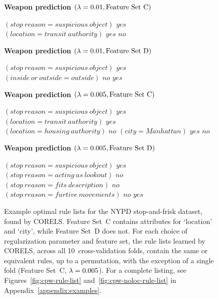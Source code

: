 \begin{figure}[t!]
\textbf{Weapon prediction $({\lambda} = 0.01, \text{Feature Set~C})$}
\vspace{1mm}
\begin{algorithmic}
\State \bif $(stop~reason = suspicious~object)$ \bthen $yes$ %
\State \belif $(location = transit~authority)$ \bthen $yes$
\State \belse $no$
\end{algorithmic}
\vspace{1mm}
\textbf{Weapon prediction $({\lambda} = 0.01, \text{Feature Set~D})$}
\vspace{1mm}
\begin{algorithmic}
\State \bif $(stop~reason = suspicious~object)$ \bthen $yes$ %
\State \belif $(inside~or~outside = outside)$ \bthen $no$
\State \belse $yes$
\end{algorithmic}
\vspace{1mm}
\textbf{Weapon prediction $({\lambda} = 0.005, \text{Feature Set~C})$}
\begin{algorithmic}
\State \bif $(stop~reason = suspicious~object)$ \bthen $yes$ %
\State \belif $(location = transit~authority)$ \bthen $yes$
\State \belif $(location = housing~authority)$ \bthen $no$
\State \belif $(city = Manhattan)$ \bthen $yes$
\State \belse $no$
\end{algorithmic}
\vspace{1mm}
\textbf{Weapon prediction $({\lambda} = 0.005, \text{Feature Set~D})$}
\vspace{1mm}
\begin{algorithmic}
\State \bif $(stop~reason = suspicious~object)$ \bthen $yes$ %
\State \belif $(stop~reason = acting~as~lookout)$ \bthen $no$
\State \belif $(stop~reason = fits~description)$ \bthen $no$
\State \belif $(stop~reason = furtive~movements)$ \bthen $no$
\State \belse $yes$
\end{algorithmic}
\caption{Example optimal rule lists for the NYPD stop-and-frisk dataset, found by CORELS.
%
Feature Set~C contains attributes for `location' and `city', while Feature Set~D does not.
%
For each choice of regularization parameter and feature set, the rule lists learned by CORELS,
across all 10~cross-validation folds, contain the same or equivalent rules, up to a permutation,
with the exception of a single fold (Feature Set~C, ${{\lambda} = 0.005}$).
%
For a complete listing, see Figures~\ref{fig:cpw-rule-list} and~\ref{fig:cpw-noloc-rule-list}
in Appendix~\ref{appendix:examples}.
}
\label{fig:nypd}
\end{figure}

